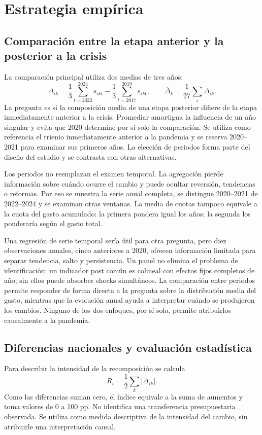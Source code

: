 \documentclass[11pt,a4paper]{article}
\begin{document}
\section{Estrategia empírica}
\subsection{Comparación entre la etapa anterior y la posterior a la crisis}
La comparación principal utiliza dos medias de tres años:
\begin{equation}
 \Delta_{ik}=\frac{1}{3}\sum_{t=2022}^{2024}s_{ikt}
             -\frac{1}{3}\sum_{t=2017}^{2019}s_{ikt},
 \qquad \overline\Delta_k=\frac{1}{27}\sum_i\Delta_{ik}.
\end{equation}
La pregunta es si la composición media de una etapa posterior difiere de la etapa inmediatamente anterior a la crisis. Promediar amortigua la influencia de un año singular y evita que 2020 determine por sí solo la comparación. Se utiliza como referencia el trienio inmediatamente anterior a la pandemia y se reserva 2020--2021 para examinar sus primeros años. La elección de periodos forma parte del diseño del estudio y se contrasta con otras alternativas.

Los periodos no reemplazan el examen temporal. La agregación pierde información sobre cuándo ocurre el cambio y puede ocultar reversión, tendencias o reformas. Por eso se muestra la serie anual completa, se distingue 2020--2021 de 2022--2024 y se examinan otras ventanas. La media de cuotas tampoco equivale a la cuota del gasto acumulado: la primera pondera igual los años; la segunda los ponderaría según el gasto total.

Una regresión de serie temporal sería útil para otra pregunta, pero diez observaciones anuales, cinco anteriores a 2020, ofrecen información limitada para separar tendencia, salto y persistencia. Un panel no elimina el problema de identificación: un indicador post común es colineal con efectos fijos completos de año; sin ellos puede absorber shocks simultáneos. La comparación entre periodos permite responder de forma directa a la pregunta sobre la distribución media del gasto, mientras que la evolución anual ayuda a interpretar cuándo se produjeron los cambios. Ninguno de los dos enfoques, por sí solo, permite atribuirlos causalmente a la pandemia.

\subsection{Diferencias nacionales y evaluación estadística}
Para describir la intensidad de la recomposición se calcula
\begin{equation}
 R_i=\frac12\sum_k|\Delta_{ik}|.
\end{equation}
Como las diferencias suman cero, el índice equivale a la suma de aumentos y toma valores de 0 a 100 pp. No identifica una transferencia presupuestaria observada. Se utiliza como medida descriptiva de la intensidad del cambio, sin atribuirle una interpretación causal.
\end{document}
